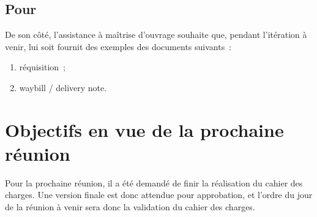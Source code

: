 \documentclass[11pt,fleqn]{report}
\begin{document}
\subsection{Pour \amo}
De son côté, l'assistance à maîtrise d'ouvrage souhaite que, pendant l'itération à venir, lui soit fournit des exemples des documents suivants~:
\begin{enumerate}
	\item réquisition~;
	\item waybill / delivery note.
\end{enumerate}

\section{Objectifs en vue de la prochaine réunion}
Pour la prochaine réunion, il a été demandé de finir la réalisation du cahier des charges. Une version finale est donc attendue pour approbation, et l'ordre du jour de la réunion à venir sera donc la validation du cahier des charges.
\end{document}
